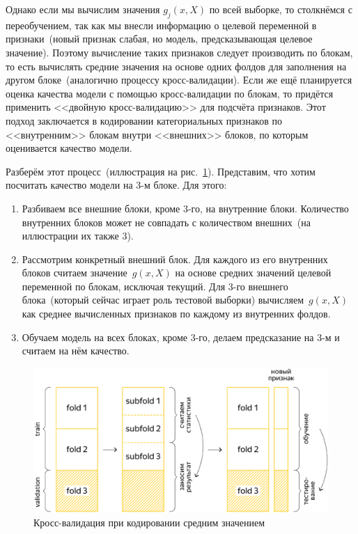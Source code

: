 \documentclass[12pt,fleqn]{article}
\begin{document}
Однако если мы вычислим значения $g_j(x, X)$ по всей выборке,
то столкнёмся с переобучением, так как мы внесли информацию о целевой переменной
в признаки~(новый признак слабая, но модель, предсказывающая целевое значение).
Поэтому вычисление таких признаков следует производить по блокам,
то есть вычислять средние значения на основе одних фолдов
для заполнения на другом блоке~(аналогично процессу кросс-валидации).
Если же ещё планируется оценка качества модели с помощью кросс-валидации по блокам,
то придётся применить <<двойную кросс-валидацию>> для подсчёта признаков.
Этот подход заключается в кодировании категориальных признаков по <<внутренним>> блокам внутри <<внешних>> блоков,
по которым оценивается качество модели.

Разберём этот процесс~(иллюстрация на рис.~\ref{fig:cv_meantarget}).
Представим, что хотим посчитать качество модели на 3-м блоке. Для этого:
\begin{enumerate}
    \item Разбиваем все внешние блоки, кроме 3-го, на внутренние блоки.
        Количество внутренних блоков может не совпадать с количеством внешних~(на иллюстрации их также 3).
    \item Рассмотрим конкретный внешний блок.
        Для каждого из его внутренних блоков считаем значение~$g(x, X)$ на основе средних значений целевой переменной по блокам,
        исключая текущий. Для 3-го внешнего блока~(который сейчас играет роль тестовой выборки)
        вычисляем~$g(x, X)$ как среднее вычисленных признаков по каждому из внутренних фолдов.
    \item Обучаем модель на всех блоках, кроме 3-го, делаем предсказание на 3-м и считаем на нём качество.
\end{enumerate}

\begin{center}
\begin{figure}[!htb]
 \centering
 \includegraphics[width=0.8\linewidth]{cv_meantarget.eps}
 \caption{Кросс-валидация при кодировании средним значением}\label{fig:cv_meantarget}
\end{figure}
\end{center}
\end{document}
